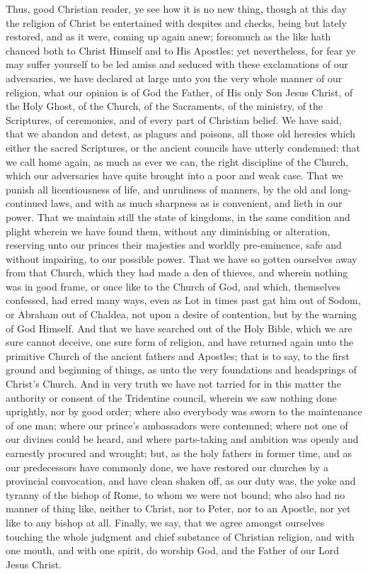 Thus, good Christian reader, ye see how it is no new thing, though
at this day the religion of Christ be entertained with despites and
checks, being but lately restored, and as it were, coming up again anew;
forsomuch as the like hath chanced both to Christ Himself and to His
Apostles: yet nevertheless, for fear ye may suffer yourself to be led
amiss and seduced with these exclamations of our adversaries, we have
declared at large unto you the very whole manner of our religion, what
our opinion is of God the Father, of His only Son Jesus Christ, of the
Holy Ghost, of the Church, of the Sacraments, of the ministry, of the
Scriptures, of ceremonies, and of every part of Christian belief.
We have said, that we abandon and detest, as plagues and poisons, all
those old heresies which either the sacred Scriptures, or the ancient
councils have utterly condemned: that we call home again, as much as
ever we can, the right discipline of the Church, which our adversaries
have quite brought into a poor and weak case. That we punish all
licentiousness of life, and unruliness of manners, by
the old and long-continued laws, and with as much sharpness as is convenient,
and lieth in our power. That we maintain still the state of kingdoms,
in the same condition and plight wherein we have found them, without
any diminishing or alteration, reserving unto our princes their majesties
and worldly pre-eminence, safe and without impairing, to our possible
power. That we have so gotten ourselves away from that Church,
which they had made a den of thieves, and wherein nothing was in good
frame, or once like to the Church of God, and which, themselves confessed,
had erred many ways, even as Lot in times past gat him out of Sodom,
or Abraham out of Chaldea, not upon a desire of contention, but by the
warning of God Himself. And that we have searched out of the Holy
Bible, which we are sure cannot deceive, one sure form of religion,
and have returned again unto the primitive Church of the ancient fathers
and Apostles; that is to say, to the first ground and beginning of things,
as unto the very foundations and headsprings of Christ’s Church.
And in very truth we have not tarried for in this matter the authority
or consent of the Tridentine council, wherein we saw nothing done uprightly,
nor by good order; where also everybody was sworn
to the maintenance of one man; where our prince’s ambassadors
were contemned; where not one of our divines could be heard, and where
parts-taking and ambition was openly and earnestly procured and wrought;
but, as the holy fathers in former time, and as our predecessors have
commonly done, we have restored our churches by a provincial convocation,
and have clean shaken off, as our duty was, the yoke and tyranny of
the bishop of Rome, to whom we were not bound; who also had no manner
of thing like, neither to Christ, nor to Peter, nor to an Apostle, nor
yet like to any bishop at all. Finally, we say, that we agree
amongst ourselves touching the whole judgment and chief substance of
Christian religion, and with one mouth, and with one spirit, do worship
God, and the Father of our Lord Jesus Christ.

